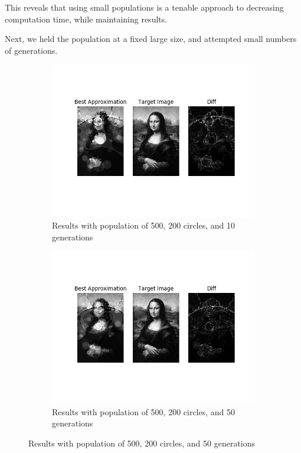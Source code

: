 \documentclass{article}
\begin{document}
This reveals that using small populations is a tenable approach to decreasing computation time,
while maintaining results.

Next, we held the population at a fixed large size, and attempted small numbers of generations.

\begin{figure}[H]
    \centering
    \begin{subfigure}[b]{0.45\textwidth}
        \centering
        \includegraphics[width=\textwidth]{output/bs-p500c200g10.png}
        \caption{Results with population of 500, 200 circles, and 10 generations}
    \end{subfigure}
    \begin{subfigure}[b]{0.45\textwidth}
        \centering
        \includegraphics[width=\textwidth]{output/bs-p500c200g50.png}
        \caption{Results with population of 500, 200 circles, and 50 generations}
    \end{subfigure}
\end{figure}
\end{document}
